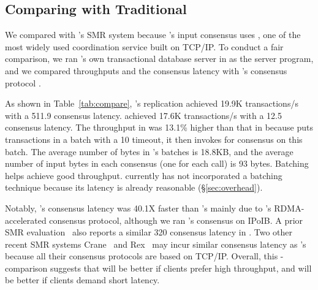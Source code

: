\subsection{Comparing with Traditional \paxos}
\label{sec:eval-traditional}

We compared \xxx with \calvin's SMR system because \calvin's input consensus
uses \zookeeper, one of the most widely used coordination service built on
TCP/IP. To conduct a fair comparison, we ran \calvin's own transactional
database server in \xxx as the server program, and we compared throughputs and
the consensus latency with \calvin's consensus protocol \zookeeper.

As shown in Table~\ref{tab:compare}, \calvin's \zookeeper replication achieved
19.9K transactions/s with a 511.9 \us consensus latency. \xxx achieved 17.6K
transactions/s with a 12.5 \us consensus latency. The throughput in \calvin
was 13.1\% higher than that in \xxx because \calvin puts transactions in a
batch with a 10 \ms timeout, it then invokes \zookeeper for consensus on
this batch. The average number of bytes in \calvin's batches is 18.8KB, and
the average number of input bytes in each \xxx consensus (one for each \myread
call) is 93 bytes. Batching helps \calvin achieve good throughput. \xxx
currently has not incorporated a batching technique because its latency is
already reasonable (\S\ref{sec:overhead}).

Notably, \xxx's consensus latency was 40.1X faster than \zookeeper's mainly due
to \xxx's RDMA-accelerated consensus protocol, although we ran \calvin's
\zookeeper consensus on IPoIB. A prior SMR evaluation~\cite{dare:hpdc15} also
reports a similar 320 \us consensus latency in \zookeeper. Two other recent SMR
systems Crane~\cite{crane:sosp15} and Rex~\cite{rex:eurosys14} may incur
similar
consensus latency as \zookeeper's because all their consensus protocols are
based on TCP/IP. Overall, this \xxx-\calvin comparison suggests that \calvin
will be better if clients prefer high throughput, and \xxx will be better if
clients demand short latency.

